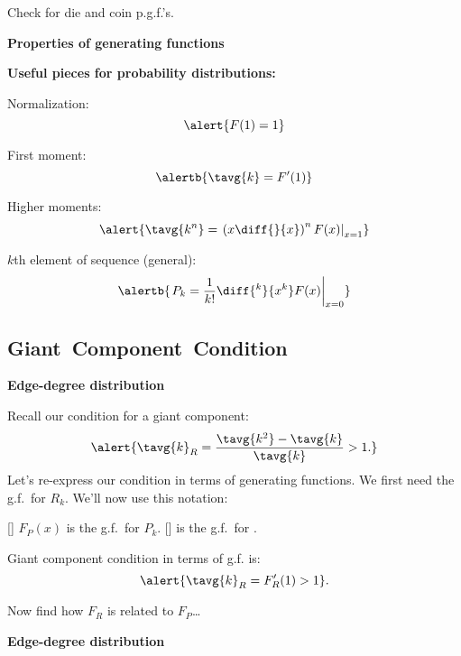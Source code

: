 \begin{frame}[label=]
\begin{frame}[label=]
\begin{frame}[label=]
\begin{frame}[label=]
      Check for die and coin p.g.f.'s.
  


\begin{frame}[label=]
  \textbf{Properties of generating functions}

  \small
  \textbf{Useful pieces for probability distributions:}
  
  
    Normalization:
    $$ \alert{F(1) = 1} $$
  
    First moment:
    $$ \alertb{\tavg{k} = F'(1)} $$
  
    Higher moments:
    $$ 
    \alert{
    \tavg{k^n} = 
    \left.
    \left(
      x \diff{}{x}
    \right)^n
    F(x)
    \right|_{x=1}
    }
    $$
  
    $k$th element of sequence (general):
    $$
    \alertb{
    \left.
      P_k
      =
      \frac{1}{k!}
      \diff{^{k}}{x^k} F(x)
    \right|_{x=0}
    }
    $$
  
  



\subsection{Giant\ Component\ Condition}

\begin{frame}[label=]
  \textbf{Edge-degree distribution}

  
   Recall our condition for
    a giant component:
    $$
    \alert{
      \tavg{k}_R = 
      \frac{\tavg{k^2} - \tavg{k}}
      {\tavg{k}}
      > 1.
    }
    $$
   Let's re-express our condition in
    terms of generating functions.
   We first need the g.f.\ for \alert{$R_k$}.
   We'll now use this notation:
    
    []  \alert{$F_P (x)$} is the g.f.\ for \alert{$P_k$}.
    []   is the g.f.\ for .
    
  
    Giant component condition in terms of g.f. is:
    $$
    \alert{\tavg{k}_R = F'_{R}(1) > 1}.
    $$
  
    Now find how $F_R$ is related to $F_P$\ldots
  

\begin{frame}[label=]
  \textbf{Edge-degree distribution}

  
  

\end{frame}
\end{frame}
\end{frame}
\end{frame}
\end{frame}
\end{frame}
\end{frame}

